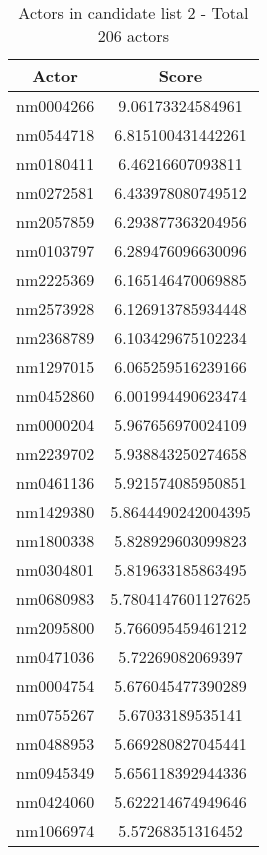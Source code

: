 \begin{table}[H]
    \centering
        \begin{tabular}{ |c|c| } 
            \hline
            \textbf{Actor} & \textbf{Score} \\ 
            \hline 
            nm0004266 & 9.06173324584961 \\
            nm0544718 & 6.815100431442261 \\
            nm0180411 & 6.46216607093811 \\
            nm0272581 & 6.433978080749512 \\
            nm2057859 & 6.293877363204956 \\
            nm0103797 & 6.289476096630096 \\
            nm2225369 & 6.165146470069885 \\
            nm2573928 & 6.126913785934448 \\
            nm2368789 & 6.103429675102234 \\
            nm1297015 & 6.065259516239166 \\
            nm0452860 & 6.001994490623474 \\
            nm0000204 & 5.967656970024109 \\
            nm2239702 & 5.938843250274658 \\
            nm0461136 & 5.921574085950851 \\
            nm1429380 & 5.8644490242004395 \\
            nm1800338 & 5.828929603099823 \\
            nm0304801 & 5.819633185863495 \\
            nm0680983 & 5.7804147601127625 \\
            nm2095800 & 5.766095459461212 \\
            nm0471036 & 5.72269082069397 \\
            nm0004754 & 5.676045477390289 \\
            nm0755267 & 5.67033189535141 \\
            nm0488953 & 5.669280827045441 \\
            nm0945349 & 5.656118392944336 \\
            nm0424060 & 5.622214674949646 \\
            nm1066974 & 5.57268351316452 \\
            \hline
        \end{tabular}
    \caption{Actors in candidate list 2 - Total 206 actors}
\end{table}

